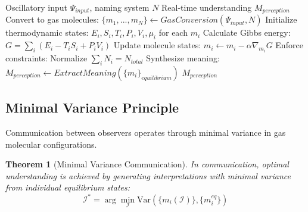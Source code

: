 \documentclass[12pt]{article}
\newtheorem{theorem}{Theorem}[section]
\theoremstyle{definition}
\theoremstyle{remark}
\begin{document}
\begin{algorithm}
\caption{Empty Dictionary Perceptual Synthesis}
\label{alg:empty_dictionary}
\begin{algorithmic}[1]
\REQUIRE Oscillatory input $\Psi_{input}$, naming system $N$
\ENSURE Real-time understanding $M_{perception}$
\STATE Convert to gas molecules: $\{m_1, ..., m_N\} \leftarrow GasConversion(\Psi_{input}, N)$
\STATE Initialize thermodynamic states: $E_i, S_i, T_i, P_i, V_i, \mu_i$ for each $m_i$
    \STATE Calculate Gibbs energy: $G = \sum_i (E_i - T_i S_i + P_i V_i)$
    \STATE Update molecule states: $m_i \leftarrow m_i - \alpha \nabla_{m_i} G$
    \STATE Enforce constraints: Normalize $\sum_i N_i = N_{total}$
\ENDWHILE
\STATE Synthesize meaning: $M_{perception} \leftarrow ExtractMeaning(\{m_i\}_{equilibrium})$
\RETURN $M_{perception}$
\end{algorithmic}
\end{algorithm}

\subsection{Minimal Variance Principle}

Communication between observers operates through minimal variance in gas molecular configurations.

\begin{theorem}[Minimal Variance Communication]
\label{thm:minimal_variance}
In communication, optimal understanding is achieved by generating interpretations with minimal variance from individual equilibrium states:
\begin{equation}
\mathcal{I}^* = \arg\min_{\mathcal{I}} \text{Var}(\{m_i(\mathcal{I})\}, \{m_i^{eq}\})
\end{equation}
\end{theorem}
\end{document}
